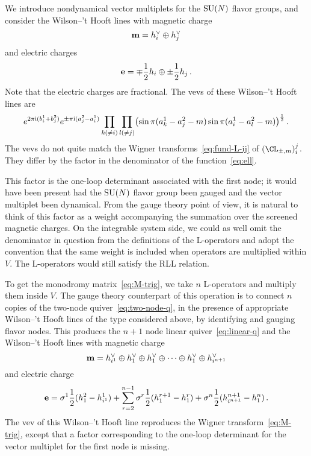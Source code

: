 We introduce nondynamical vector multiplets for the $\mathrm{SU}(N)$ flavor
groups, and consider the Wilson--'t Hooft lines with magnetic charge
\begin{equation}
  \mathbf{m} = h^\vee_i \oplus h^\vee_j
\end{equation}
and electric charges
\begin{equation}
  \mathbf{e} =  \mp\frac12 h_i \oplus \pm\frac12 h_j\,.
\end{equation}
Note that the electric charges are fractional.  The vevs of these
Wilson--'t Hooft lines are
\begin{equation}
  e^{2\pi\mathrm{i} (b^1_i + b^2_j)}
  e^{\pm\pi\mathrm{i} (a^2_j - a^1_i)}
  \prod_{k (\neq i)}
  \prod_{l (\neq j)}
  \bigl(\sin\pi(a^1_k - a^2_j - m)
  \sin\pi(a^1_i - a^2_l - m)\bigr)^{\frac12} \,.
\end{equation}
The vevs do not quite match the Wigner transforms~\eqref{eq:fund-L-ij}
of $(\CL_{\pm,m})_i^j$.  They differ by the factor in the denominator
of the function~\eqref{eq:ell}.

This factor is the one-loop determinant associated with the first
node; it would have been present had the $\mathrm{SU}(N)$ flavor group been
gauged and the vector multiplet been dynamical.  From the gauge theory
point of view, it is natural to think of this factor as a weight
accompanying the summation over the screened magnetic charges.  On the
integrable system side, we could as well omit the denominator in
question from the definitions of the L-operators and adopt the
convention that the same weight is included when operators are
multiplied within $V$.  The L-operators would still satisfy the RLL
relation.

To get the monodromy matrix~\eqref{eq:M-trig}, we take $n$ L-operators
and multiply them inside $V$.  The gauge theory counterpart of this
operation is to connect $n$ copies of the two-node
quiver~\eqref{eq:two-node-q}, in the presence of appropriate
Wilson--'t Hooft lines of the type considered above, by identifying
and gauging flavor nodes.  This produces the $n+1$ node linear
quiver~\eqref{eq:linear-q} and the Wilson--'t Hooft lines with
magnetic charge
\begin{equation}
  \label{eq:B-linear}
  \mathbf{m}
  =
  h^\vee_{i^1} \oplus h^\vee_1 \oplus h^\vee_1 \oplus \dotsb \oplus h^\vee_1
  \oplus h^\vee_{i^{n+1}}
\end{equation}
and electric charge
\begin{equation}
  \mathbf{e}
  =
  \sigma^1 \frac12 (h_1^2 - h_{i^1}^1)
  + \sum_{r=2}^{n-1} \sigma^r \frac12 (h^{r+1}_1 - h^r_1)
  + \sigma^n \frac12 (h_{i^{n+1}}^{n+1} - h_1^n) \,.
\end{equation}
The vev of this Wilson--'t Hooft line reproduces the Wigner
transform~\eqref{eq:M-trig}, except that a factor corresponding to the
one-loop determinant for the vector multiplet for the first node is
missing.



